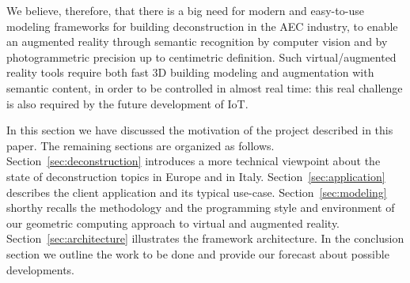We believe, therefore, that there is a big need for modern and easy-to-use modeling frameworks for building deconstruction in the AEC industry, to enable an augmented reality through semantic recognition by computer vision and by photogrammetric precision up to centimetric definition. Such virtual/augmented reality tools require both fast 3D building modeling and augmentation with semantic content, in order to be controlled in almost real time: this real challenge is also required by the future development of IoT. 	       
 
In this section we have discussed the motivation of the project described in this paper. The remaining sections are organized as follows.
Section~\ref{sec:deconstruction} introduces a more technical viewpoint about the state of deconstruction topics in Europe and in Italy.
Section~\ref{sec:application} describes the client application and its typical use-case. 
Section~\ref{sec:modeling} shorthy recalls the methodology and the programming style and environment of our geometric computing approach to virtual and augmented reality.
Section~\ref{sec:architecture} illustrates the framework architecture. 
In the conclusion section we outline the work to be done and provide our forecast about possible developments.
